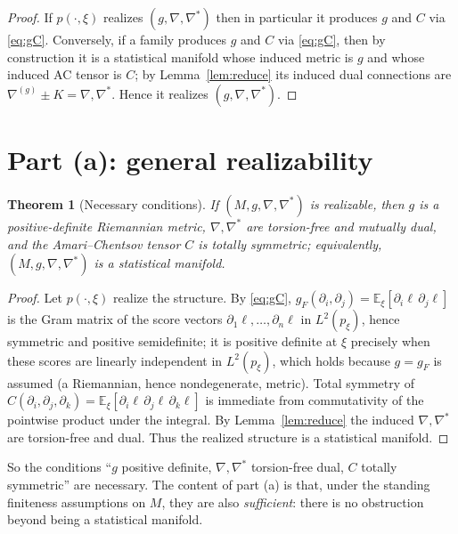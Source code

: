 \documentclass{amsart}
\newtheorem{theorem}{Theorem}
\theoremstyle{definition}
\theoremstyle{remark}
\begin{document}
\begin{proof}
If $p(\cdot,\xi)$ realizes $(g,\nabla,\nabla^{*})$ then in particular it produces
$g$ and $C$ via \eqref{eq:gC}. Conversely, if a family produces $g$ and $C$ via
\eqref{eq:gC}, then by construction it is a statistical manifold whose induced
metric is $g$ and whose induced AC tensor is $C$; by Lemma~\ref{lem:reduce} its
induced dual connections are $\nabla^{(g)}\pm K=\nabla,\nabla^{*}$. Hence it
realizes $(g,\nabla,\nabla^{*})$.
\end{proof}

\section{Part (a): general realizability}

\begin{theorem}[Necessary conditions]\label{thm:nec}
If $(M,g,\nabla,\nabla^{*})$ is realizable, then $g$ is a positive-definite
Riemannian metric, $\nabla,\nabla^{*}$ are torsion-free and mutually dual, and
the Amari--Chentsov tensor $C$ is totally symmetric; equivalently,
$(M,g,\nabla,\nabla^{*})$ is a statistical manifold.
\end{theorem}

\begin{proof}
Let $p(\cdot,\xi)$ realize the structure. By \eqref{eq:gC},
$g_{F}(\partial_{i},\partial_{j})=\mathbb E_{\xi}[\partial_{i}\ell\,\partial_{j}\ell]$
is the Gram matrix of the score vectors $\partial_{1}\ell,\dots,\partial_{n}\ell$
in $L^{2}(p_{\xi})$, hence symmetric and positive semidefinite; it is positive
definite at $\xi$ precisely when these scores are linearly independent in
$L^{2}(p_{\xi})$, which holds because $g=g_{F}$ is assumed (a Riemannian, hence
nondegenerate, metric). Total symmetry of
$C(\partial_{i},\partial_{j},\partial_{k})=\mathbb E_{\xi}[\partial_{i}\ell\,
\partial_{j}\ell\,\partial_{k}\ell]$ is immediate from commutativity of the
pointwise product under the integral. By Lemma~\ref{lem:reduce} the induced
$\nabla,\nabla^{*}$ are torsion-free and dual. Thus the realized structure is a
statistical manifold.
\end{proof}

So the conditions ``$g$ positive definite, $\nabla,\nabla^{*}$ torsion-free dual,
$C$ totally symmetric'' are necessary. The content of part (a) is that, under the
standing finiteness assumptions on $M$, they are also \emph{sufficient}: there is
no obstruction beyond being a statistical manifold.
\end{document}
